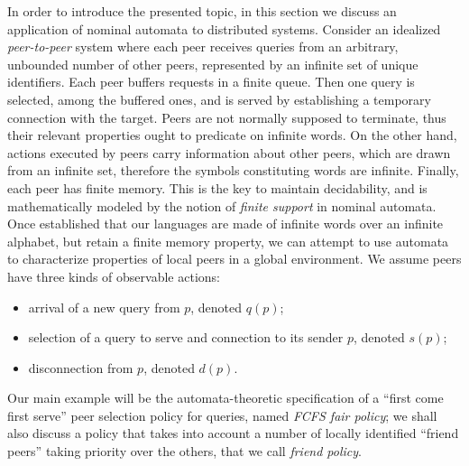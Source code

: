 
In order to introduce the presented topic, in this section we discuss an application of nominal automata to distributed systems. Consider an idealized \emph{peer-to-peer} system where each peer receives queries from an arbitrary, unbounded number of other peers, represented by an infinite set of unique identifiers. Each peer buffers requests in a finite queue. Then one query is selected, among the buffered ones, and is served by establishing a temporary connection with the target. Peers are not normally supposed to terminate, thus their relevant properties ought to predicate on infinite words. On the other hand, actions executed by peers carry information about other peers, which are drawn from an infinite set, therefore the symbols constituting words are infinite. Finally, each peer has finite memory. This is the key to maintain decidability, and is mathematically modeled by the notion of \emph{finite support} in nominal automata. Once established that our languages are made of infinite words over an infinite alphabet, but retain a finite memory property, we can attempt to use automata to characterize properties of local peers in a global environment. 
We assume peers have three kinds of observable actions: 
\begin{itemize}
	\item arrival of a new query from $p$, denoted $q(p)$; 
	\item selection of a query to serve and connection to its sender $p$, denoted $s(p)$; 
	\item disconnection from $p$, denoted $d(p)$.
\end{itemize}
%


Our main example will be the automata-theoretic specification of a ``first come first serve'' peer selection policy for queries, named \emph{FCFS fair policy}; we shall also discuss a policy that takes into account a number of locally identified ``friend peers'' taking priority over the others, that we call \emph{friend policy}. 


